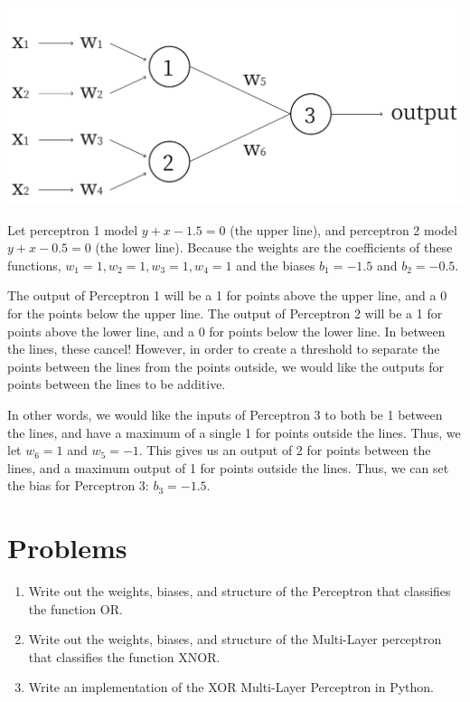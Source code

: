 \documentclass{article}
\begin{document}
\begin{center}
\includegraphics[scale=0.3]{Frame}
\end{center}

Let perceptron 1 model $y + x - 1.5 = 0$ (the upper line), and perceptron 2 model $y + x - 0.5 = 0$ (the lower line). Because the weights are the coefficients of these functions, $w_1 = 1, w_2 = 1, w_3 = 1, w_4 = 1$ and the biases $b_1 = -1.5$ and $b_2 = -0.5$.

The output of Perceptron 1 will be a 1 for points above the upper line, and a 0 for the points below the upper line. The output of Perceptron 2 will be a 1 for points above the lower line, and a 0 for points below the lower line. In between the lines, these cancel! However, in order to create a threshold to separate the points between the lines from the points outside, we would like the outputs for points between the lines to be additive.

In other words, we would like the inputs of Perceptron 3 to both be 1 between the lines, and have a maximum of a single 1 for points outside the lines. Thus, we let $w_6 = 1$ and $w_5 = -1$. This gives us an output of $2$ for points between the lines, and a maximum output of 1 for points outside the lines. Thus, we can set the bias for Perceptron 3: $b_3 = -1.5$.

\section{Problems}
\begin{enumerate}
    \item Write out the weights, biases, and structure of the Perceptron that classifies the function OR.
    \item Write out the weights, biases, and structure of the Multi-Layer perceptron that classifies the function XNOR.
    \item Write an implementation of the XOR Multi-Layer Perceptron in Python.
\end{enumerate}
\end{document}
